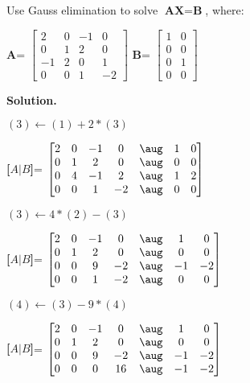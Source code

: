 \begin{exercise}{1} %
Use Gauss elimination to solve $\textbf{AX}=\textbf{B}$, where:
\begin{center}
\textbf{A}= 
$\begin{bmatrix}
2&0&-1&0\\ 
0&1&2&0\\
-1&2&0&1\\
0&0&1&-2
\end{bmatrix}
$ 
\textbf{B}= 
$\begin{bmatrix}
1&0\\ 0&0\\ 0&1 \\ 0&0
\end{bmatrix}
$ 
\end{center}

\textbf{Solution.} 

$(3) \longleftarrow (1) + 2*(3)$

\begin{center}
\textbf{[$A \vert B$]}= 
$\begin{bmatrix}
2&0&-1&0 &\aug & 1 & 0\\ 
0&1&2&0 &\aug & 0 & 0\\
0&4&-1&2&\aug & 1 & 2\\
0&0&1&-2&\aug & 0 & 0
\end{bmatrix}
$ 
\end{center}

$(3) \longleftarrow 4*(2) - (3)$
\begin{center}
\textbf{[$A \vert B$]}= 
$\begin{bmatrix}
2&0&-1&0 &\aug & 1 & 0\\ 
0&1&2&0 &\aug & 0 & 0\\
0&0&9&-2&\aug & -1 & -2\\
0&0&1&-2&\aug & 0 & 0
\end{bmatrix}
$ 
\end{center}

$(4) \longleftarrow (3) - 9*(4)$
\begin{center}
\textbf{[$A \vert B$]}= 
$\begin{bmatrix}
2&0&-1&0 &\aug & 1 & 0\\ 
0&1&2&0 &\aug & 0 & 0\\
0&0&9&-2&\aug & -1 & -2\\
0&0&0&16&\aug & -1 & -2
\end{bmatrix}
$ 
\end{center}


\end{exercise}
